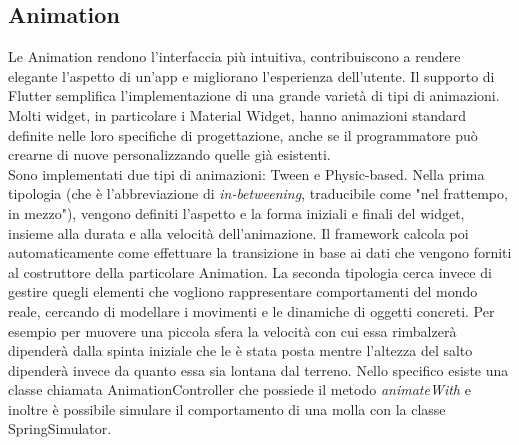 	\subsection{Animation}
	Le Animation rendono l'interfaccia più intuitiva, contribuiscono a
	rendere elegante 
	l'aspetto di un'app e migliorano l'esperienza dell'utente. Il
	supporto di Flutter semplifica l'implementazione di una grande varietà di tipi di
	animazioni. Molti widget, in particolare i Material Widget, hanno
	animazioni standard definite nelle loro specifiche di progettazione, 
	anche se il programmatore può crearne di nuove personalizzando quelle già esistenti. \\
	Sono implementati due tipi di animazioni: Tween e Physic-based. Nella prima tipologia
	(che è l'abbreviazione di \textit{in-betweening}, traducibile come "nel frattempo,
	in mezzo"), vengono definiti l'aspetto e la forma iniziali e finali del
	widget, insieme alla durata e alla velocità dell'animazione. Il framework
	calcola poi automaticamente come effettuare la transizione in base ai dati
	che vengono forniti al costruttore della particolare Animation. La seconda
	tipologia cerca invece di gestire quegli elementi che vogliono rappresentare
	comportamenti del mondo reale, cercando di modellare i movimenti e le
	dinamiche di oggetti concreti. Per esempio per muovere una piccola sfera la
	velocità con cui essa rimbalzerà dipenderà dalla spinta iniziale che le è
	stata posta mentre l'altezza del salto dipenderà invece da quanto essa sia lontana dal terreno.
	Nello specifico esiste una classe chiamata AnimationController che possiede
	il metodo \textit{animateWith} e inoltre è possibile simulare il
	comportamento di una molla con la classe SpringSimulator.
	


	
